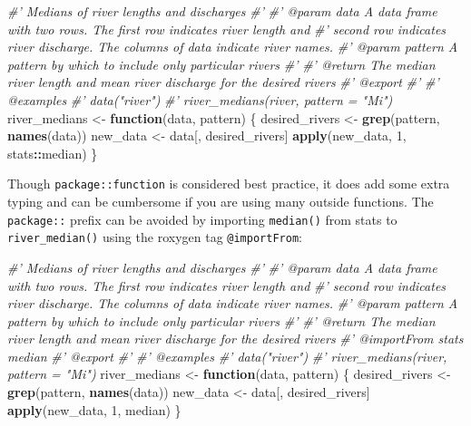 \documentclass[
]{book}
\newenvironment{Shaded}{\begin{snugshade}}{\end{snugshade}}
\newcommand{\CommentTok}[1]{\textcolor[rgb]{0.56,0.35,0.01}{\textit{#1}}}
\newcommand{\ControlFlowTok}[1]{\textcolor[rgb]{0.13,0.29,0.53}{\textbf{#1}}}
\newcommand{\DecValTok}[1]{\textcolor[rgb]{0.00,0.00,0.81}{#1}}
\newcommand{\KeywordTok}[1]{\textcolor[rgb]{0.13,0.29,0.53}{\textbf{#1}}}
\newcommand{\NormalTok}[1]{#1}
\newcommand{\OperatorTok}[1]{\textcolor[rgb]{0.81,0.36,0.00}{\textbf{#1}}}
\newcommand{\StringTok}[1]{\textcolor[rgb]{0.31,0.60,0.02}{#1}}
\begin{document}
\begin{Shaded}
\begin{Highlighting}[]
\CommentTok{#' Medians of river lengths and discharges}
\CommentTok{#'}
\CommentTok{#' @param data A data frame with two rows. The first row indicates river length and}
\CommentTok{#'   second row indicates river discharge. The columns of data indicate river names.}
\CommentTok{#' @param pattern A pattern by which to include only particular rivers}
\CommentTok{#'}
\CommentTok{#' @return The median river length and mean river discharge for the desired rivers}
\CommentTok{#' @export}
\CommentTok{#'}
\CommentTok{#' @examples}
\CommentTok{#' data("river")}
\CommentTok{#' river_medians(river, pattern = "Mi")}
\NormalTok{river_medians <-}\StringTok{ }\ControlFlowTok{function}\NormalTok{(data, pattern) \{}
\NormalTok{  desired_rivers <-}\StringTok{ }\KeywordTok{grep}\NormalTok{(pattern, }\KeywordTok{names}\NormalTok{(data))}
\NormalTok{  new_data <-}\StringTok{ }\NormalTok{data[, desired_rivers]}
  \KeywordTok{apply}\NormalTok{(new_data, }\DecValTok{1}\NormalTok{, stats}\OperatorTok{::}\NormalTok{median)}
\NormalTok{\}}
\end{Highlighting}
\end{Shaded}

Though \texttt{package::function} is considered best practice, it does add some extra typing and can be cumbersome if you are using many outside functions. The \texttt{package::} prefix can be avoided by importing \texttt{median()} from stats to \texttt{river\_median()} using the roxygen tag \texttt{@importFrom}:

\begin{Shaded}
\begin{Highlighting}[]
\CommentTok{#' Medians of river lengths and discharges}
\CommentTok{#'}
\CommentTok{#' @param data A data frame with two rows. The first row indicates river length and}
\CommentTok{#'   second row indicates river discharge. The columns of data indicate river names.}
\CommentTok{#' @param pattern A pattern by which to include only particular rivers}
\CommentTok{#'}
\CommentTok{#' @return The median river length and mean river discharge for the desired rivers}
\CommentTok{#' @importFrom stats median}
\CommentTok{#' @export}
\CommentTok{#'}
\CommentTok{#' @examples}
\CommentTok{#' data("river")}
\CommentTok{#' river_medians(river, pattern = "Mi")}
\NormalTok{river_medians <-}\StringTok{ }\ControlFlowTok{function}\NormalTok{(data, pattern) \{}
\NormalTok{  desired_rivers <-}\StringTok{ }\KeywordTok{grep}\NormalTok{(pattern, }\KeywordTok{names}\NormalTok{(data))}
\NormalTok{  new_data <-}\StringTok{ }\NormalTok{data[, desired_rivers]}
  \KeywordTok{apply}\NormalTok{(new_data, }\DecValTok{1}\NormalTok{, median)}
\NormalTok{\}}
\end{Highlighting}
\end{Shaded}
\end{document}
